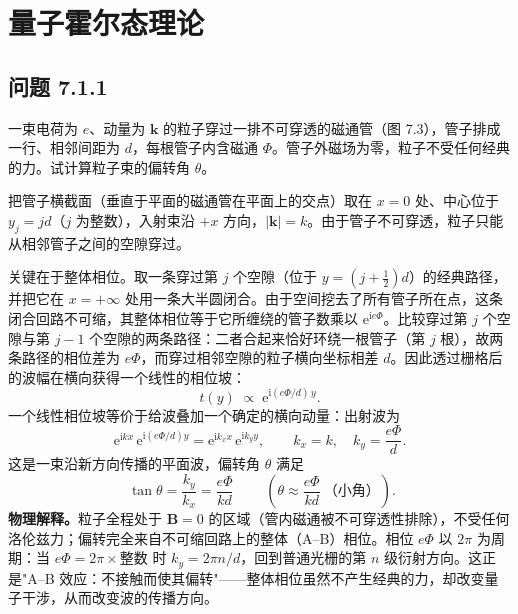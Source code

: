 \chapter{量子霍尔态理论}

\section*{问题 7.1.1}
\begin{problem}
一束电荷为 $e$、动量为 $\pmb{k}$ 的粒子穿过一排不可穿透的磁通管（图 7.3），管子排成一行、相邻间距为 $d$，每根管子内含磁通 $\Phi$。管子外磁场为零，粒子不受任何经典的力。试计算粒子束的偏转角 $\theta$。
\end{problem}
\solution
把管子横截面（垂直于平面的磁通管在平面上的交点）取在 $x=0$ 处、中心位于 $y_j=jd$（$j$ 为整数），入射束沿 $+x$ 方向，$|\pmb{k}|=k$。由于管子不可穿透，粒子只能从相邻管子之间的空隙穿过。

关键在于整体相位。取一条穿过第 $j$ 个空隙（位于 $y=(j+\tfrac12)d$）的经典路径，并把它在 $x=+\infty$ 处用一条大半圆闭合。由于空间挖去了所有管子所在点，这条闭合回路不可缩，其整体相位等于它所缠绕的管子数乘以 $\mathrm{e}^{\mathrm{i}e\Phi}$。比较穿过第 $j$ 个空隙与第 $j-1$ 个空隙的两条路径：二者合起来恰好环绕一根管子（第 $j$ 根），故两条路径的相位差为 $e\Phi$，而穿过相邻空隙的粒子横向坐标相差 $d$。因此透过栅格后的波幅在横向获得一个线性的相位坡：
\begin{equation*}
t(y)\;\propto\;\mathrm{e}^{\mathrm{i}(e\Phi/d)\,y}.
\end{equation*}
一个线性相位坡等价于给波叠加一个确定的横向动量：出射波为
\begin{equation*}
\mathrm{e}^{\mathrm{i}kx}\,\mathrm{e}^{\mathrm{i}(e\Phi/d)y}
=\mathrm{e}^{\mathrm{i}k_xx}\,\mathrm{e}^{\mathrm{i}k_yy},
\qquad k_x=k,\quad k_y=\frac{e\Phi}{d}.
\end{equation*}
这是一束沿新方向传播的平面波，偏转角 $\theta$ 满足
\begin{equation*}
\boxed{\;\tan\theta=\frac{k_y}{k_x}=\frac{e\Phi}{kd}\;}
\qquad\left(\theta\approx\frac{e\Phi}{kd}\ \text{（小角）}\right).
\end{equation*}
\textbf{物理解释。}粒子全程处于 $\pmb{B}=0$ 的区域（管内磁通被不可穿透性排除），不受任何洛伦兹力；偏转完全来自不可缩回路上的整体（A--B）相位。相位 $e\Phi$ 以 $2\pi$ 为周期：当 $e\Phi=2\pi\times$整数 时 $k_y=2\pi n/d$，回到普通光栅的第 $n$ 级衍射方向。这正是"A--B 效应：不接触而使其偏转"——整体相位虽然不产生经典的力，却改变量子干涉，从而改变波的传播方向。

